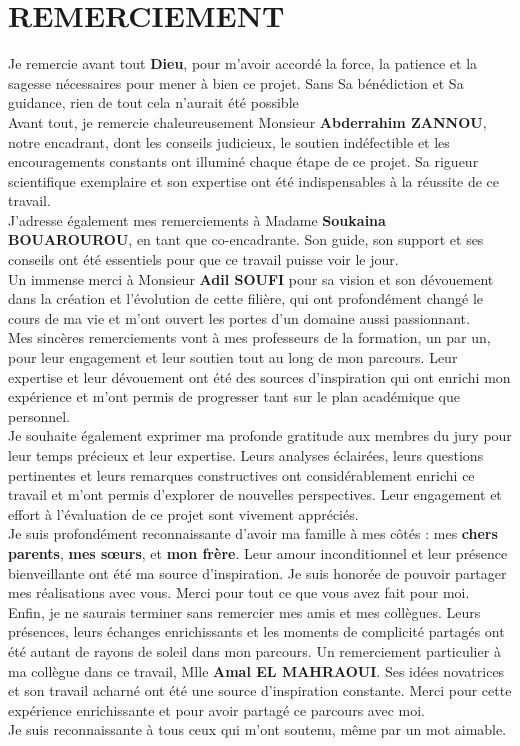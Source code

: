 
\newpage
\chapter*{REMERCIEMENT}

\normalsize
Je remercie avant tout \textbf{Dieu}, pour m'avoir accordé la force, la patience et la sagesse nécessaires pour mener à bien ce projet. Sans Sa bénédiction et Sa guidance, rien de tout cela n'aurait été possible \\
Avant tout, je remercie chaleureusement Monsieur \textbf{Abderrahim ZANNOU}, notre encadrant, dont les conseils judicieux, le soutien indéfectible et les encouragements constants ont illuminé chaque étape de ce projet. Sa rigueur scientifique exemplaire et son expertise ont été indispensables à la réussite de ce travail.\\
J’adresse également mes remerciements à Madame \textbf{Soukaina BOUAROUROU}, en tant que co-encadrante. Son guide, son support et ses conseils ont été essentiels pour que ce travail puisse voir le jour.\\
Un immense merci à Monsieur \textbf{Adil SOUFI} pour sa vision et son dévouement dans la création et l’évolution de cette filière, qui ont profondément changé le cours de ma vie et m’ont ouvert les portes d’un domaine aussi passionnant.\\
Mes sincères remerciements vont à mes professeurs de la formation, un par un, pour leur engagement et leur soutien tout au long de mon parcours. Leur expertise et leur dévouement ont été des sources d’inspiration qui ont enrichi mon expérience et m’ont permis de progresser tant sur le plan académique que personnel.\\
Je souhaite également exprimer ma profonde gratitude aux membres du jury pour leur temps précieux et leur expertise. Leurs analyses éclairées, leurs questions pertinentes et leurs remarques constructives ont considérablement enrichi ce travail et m'ont permis d'explorer de nouvelles perspectives. Leur engagement et effort à l'évaluation de ce projet sont vivement appréciés.\\
Je suis profondément reconnaissante d’avoir ma famille à mes côtés : mes \textbf{chers parents}, \textbf{mes sœurs}, et \textbf{mon frère}. Leur amour inconditionnel et leur présence bienveillante ont été ma source d’inspiration. Je suis honorée de pouvoir partager mes réalisations avec vous. Merci pour tout ce que vous avez fait pour moi.\\
Enfin, je ne saurais terminer sans remercier mes amis et mes collègues. Leurs présences, leurs échanges enrichissants et les moments de complicité partagés ont été autant de rayons de soleil dans mon parcours. Un remerciement particulier à ma collègue dans ce travail, Mlle \textbf{Amal EL MAHRAOUI}. Ses idées novatrices et son travail acharné ont été une source d’inspiration constante. Merci pour cette expérience enrichissante et pour avoir partagé ce parcours avec moi.\\
Je suis reconnaissante à tous ceux qui m'ont soutenu, même par un mot aimable. \\


